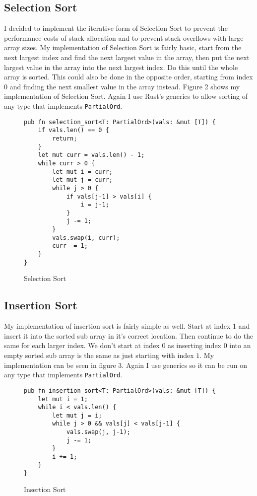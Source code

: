 \documentclass[12pt,letterpaper]{report}
\newcommand{\rust}[1]{\texttt{#1}}
\begin{document}
	\subsection*{Selection Sort}
	I decided to implement the iterative form of Selection Sort\cite{selection_sort} to prevent the performance costs of stack allocation and to prevent stack overflows with large array sizes. My implementation of Selection Sort is fairly basic, start from the next largest index and find the next largest value in the array, then put the next largest value in the array into the next largest index. Do this until the whole array is sorted. This could also be done in the opposite order, starting from index $0$ and finding the next smallest value in the array instead. Figure 2 shows my implementation of Selection Sort. Again I use Rust's generics to allow sorting of any type that implements \rust{PartialOrd}.

	\begin{figure}[H]
	\begin{verbatim}
pub fn selection_sort<T: PartialOrd>(vals: &mut [T]) {
    if vals.len() == 0 {
        return;
    }
    let mut curr = vals.len() - 1;
    while curr > 0 {
        let mut i = curr;
        let mut j = curr;
        while j > 0 {
            if vals[j-1] > vals[i] {
                i = j-1;
            }
            j -= 1;
        }
        vals.swap(i, curr);
        curr -= 1;
    }
}
	\end{verbatim}
	\caption{Selection Sort}
\end{figure}

	\subsection*{Insertion Sort}
	My implementation of insertion sort\cite{insertion_sort} is fairly simple as well. Start at index $1$ and insert it into the sorted sub array in it's correct location. Then continue to do the same for each larger index. We don't start at index $0$ as inserting index $0$ into an empty sorted sub array is the same as just starting with index $1$. My implementation can be seen in figure 3. Again I use generics so it can be run on any type that implements \rust{PartialOrd}.
	
	\begin{figure}[H]
	\begin{verbatim}
pub fn insertion_sort<T: PartialOrd>(vals: &mut [T]) {
    let mut i = 1;
    while i < vals.len() {
        let mut j = i;
        while j > 0 && vals[j] < vals[j-1] {
            vals.swap(j, j-1);
            j -= 1;
        }
        i += 1;
    }
}
	\end{verbatim}
	\caption{Insertion Sort}
\end{figure}
	
\end{document}
